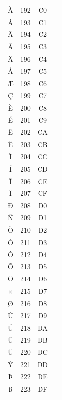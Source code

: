 ﻿\documentclass[10pt]{article}
\begin{document}
\begin{tabular}{crcl}
À&192&C0&\\
Á&193&C1&\\
Â&194&C2&\\
Ã&195&C3&\\
Ä&196&C4&\\
Å&197&C5&\\
Æ&198&C6&\\
Ç&199&C7&\\
È&200&C8&\\
É&201&C9&\\
Ê&202&CA&\\
Ë&203&CB&\\
Ì&204&CC&\\
Í&205&CD&\\
Î&206&CE&\\
Ï&207&CF&\\
Ð&208&D0&\\
Ñ&209&D1&\\
Ò&210&D2&\\
Ó&211&D3&\\
Ô&212&D4&\\
Õ&213&D5&\\
Ö&214&D6&\\
×&215&D7&\\
Ø&216&D8&\\
Ù&217&D9&\\
Ú&218&DA&\\
Û&219&DB&\\
Ü&220&DC&\\
Ý&221&DD&\\
Þ&222&DE&\\
ß&223&DF&\\
\end{tabular}
\end{document}
